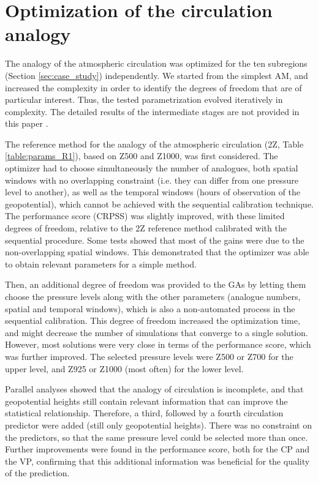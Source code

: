 \documentclass[review]{elsarticle}
\begin{document}
\section{Optimization of the circulation analogy}
\label{sec:optim_circul}

The analogy of the atmospheric circulation was optimized for the ten subregions (Section \ref{sec:case_study}) independently. We started from the simplest AM, and increased the complexity in order to identify the degrees of freedom that are of particular interest. Thus, the tested parametrization evolved iteratively in complexity. The detailed results of the intermediate stages are not provided in this paper \citep[see][for the details]{Horton2012a}.

The reference method for the analogy of the atmospheric circulation (2Z, Table \ref{table:params_R1}), based on Z500 and Z1000, was first considered. The optimizer had to choose simultaneously the number of analogues, both spatial windows with no overlapping constraint (i.e. they can differ from one pressure level to another), as well as the temporal windows (hours of observation of the geopotential), which cannot be achieved with the sequential calibration technique. The performance score (CRPSS) was slightly improved, with these limited degrees of freedom, relative to the 2Z reference method calibrated with the sequential procedure. Some tests showed that most of the gains were due to the non-overlapping spatial windows. This demonstrated that the optimizer was able to obtain relevant parameters for a simple method.

Then, an additional degree of freedom was provided to the GAs by letting them choose the pressure levels along with the other parameters (analogue numbers, spatial and temporal windows), which is also a non-automated process in the sequential calibration. This degree of freedom increased the optimization time, and might decrease the number of simulations that converge to a single solution. However, most solutions were very close in terms of the performance score, which was further improved. The selected pressure levels were Z500 or Z700 for the upper level, and Z925 or Z1000 (most often) for the lower level.

Parallel analyses showed that the analogy of circulation is incomplete, and that geopotential heights still contain relevant information that can improve the statistical relationship. Therefore, a third, followed by a fourth circulation predictor were added (still only geopotential heights). There was no constraint on the predictors, so that the same pressure level could be selected more than once. Further improvements were found in the performance score, both for the CP and the VP, confirming that this additional information was beneficial for the quality of the prediction. 
\end{document}
